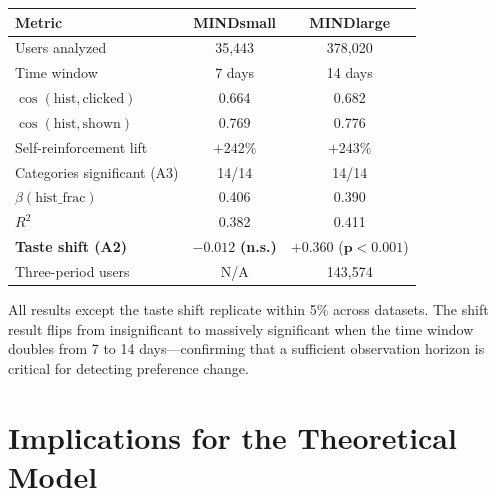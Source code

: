 \documentclass[11pt]{article}
\begin{document}
\begin{center}
\begin{tabular}{lcc}
\toprule
Metric & MINDsmall & MINDlarge \\
\midrule
Users analyzed & 35,443 & 378,020 \\
Time window & 7 days & 14 days \\
$\cos(\text{hist}, \text{clicked})$ & 0.664 & 0.682 \\
$\cos(\text{hist}, \text{shown})$ & 0.769 & 0.776 \\
Self-reinforcement lift & $+242\%$ & $+243\%$ \\
Categories significant (A3) & 14/14 & 14/14 \\
$\beta(\text{hist\_frac})$ & 0.406 & 0.390 \\
$R^2$ & 0.382 & 0.411 \\
\textbf{Taste shift (A2)} & $\boldsymbol{-0.012}$ \textbf{(n.s.)} & $\boldsymbol{+0.360}$ ($\boldsymbol{p < 0.001}$) \\
Three-period users & N/A & 143,574 \\
\bottomrule
\end{tabular}
\end{center}

All results except the taste shift replicate within 5\% across datasets. The shift result flips from insignificant to massively significant when the time window doubles from 7 to 14 days---confirming that a sufficient observation horizon is critical for detecting preference change.


\section{Implications for the Theoretical Model}
\end{document}
